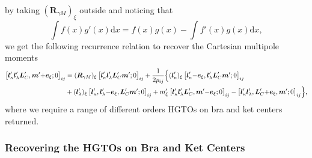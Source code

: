 \documentclass[a4paper,11pt,twoside,openright]{book}
\begin{document}
by taking $(\boldsymbol{R}_{\gamma M})_{\xi}$ outside and noticing that
\begin{equation}
  \int f(x)g'(x)\mathrm{d}x=f(x)g(x)-\int f'(x)g(x)\mathrm{d}x,
\end{equation}
we get the following recurrence relation to recover the Cartesian multipole moments
\begin{align}
  \label{eq:r-1-multipole-order}
  \left[\boldsymbol{l}'_{\kappa}\boldsymbol{l}'_{\lambda}\boldsymbol{L}'_{C},%
    \boldsymbol{m}'\mathrm{+}\boldsymbol{e}_{\xi};0\right]_{ij}
  &=(\boldsymbol{R}_{\gamma M})_{\xi}\left[\boldsymbol{l}'_{\kappa}\boldsymbol{l}'_{\lambda}%
    \boldsymbol{L}'_{C}\boldsymbol{m}';0\right]_{ij}%
  +\frac{1}{2p_{ij}}\Bigl\{(\boldsymbol{l}'_{\kappa})_{\xi}\left[\boldsymbol{l}'_{\kappa}\mathrm{-}\boldsymbol{e}_{\xi},%
    \boldsymbol{l}'_{\lambda}\boldsymbol{L}'_{C}\boldsymbol{m}';0\right]_{ij}\\
  &+(\boldsymbol{l}'_{\lambda})_{\xi}\left[\boldsymbol{l}'_{\kappa},%
    \boldsymbol{l}'_{\lambda}\mathrm{-}\boldsymbol{e}_{\xi},%
    \boldsymbol{L}'_{C}\boldsymbol{m}';0\right]_{ij}
  +m'_{\xi}\left[\boldsymbol{l}'_{\kappa}\boldsymbol{l}'_{\lambda}\boldsymbol{L}'_{C},%
    \boldsymbol{m}'\mathrm{-}\boldsymbol{e}_{\xi};0\right]_{ij}
  -\left[\boldsymbol{l}'_{\kappa}\boldsymbol{l}'_{\lambda},%
    \boldsymbol{L}'_{C}\mathrm{+}\boldsymbol{e}_{\xi},\boldsymbol{m}';0\right]_{ij}\Bigr\},\nonumber
\end{align}
where we require a range of different orders HGTOs on bra and ket centers returned.

\subsubsection{Recovering the HGTOs on Bra and Ket Centers}
\end{document}
